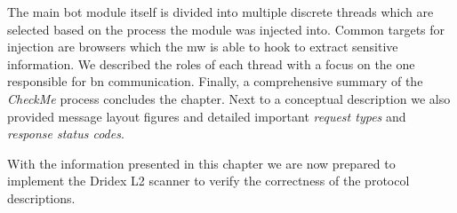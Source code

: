 The main bot module itself is divided into multiple discrete threads which are selected based on the process the module was injected into.
Common targets for injection are browsers which the \gls{mw} is able to hook to extract sensitive information.
We described the roles of each thread with a focus on the one responsible for \gls{bn} communication.
Finally, a comprehensive summary of the \emph{CheckMe} process concludes the chapter.
Next to a conceptual description we also provided message layout figures and detailed important \emph{request types} and \emph{response status codes}.

With the information presented in this chapter we are now prepared to implement the Dridex L2 scanner to verify the correctness of the protocol descriptions.